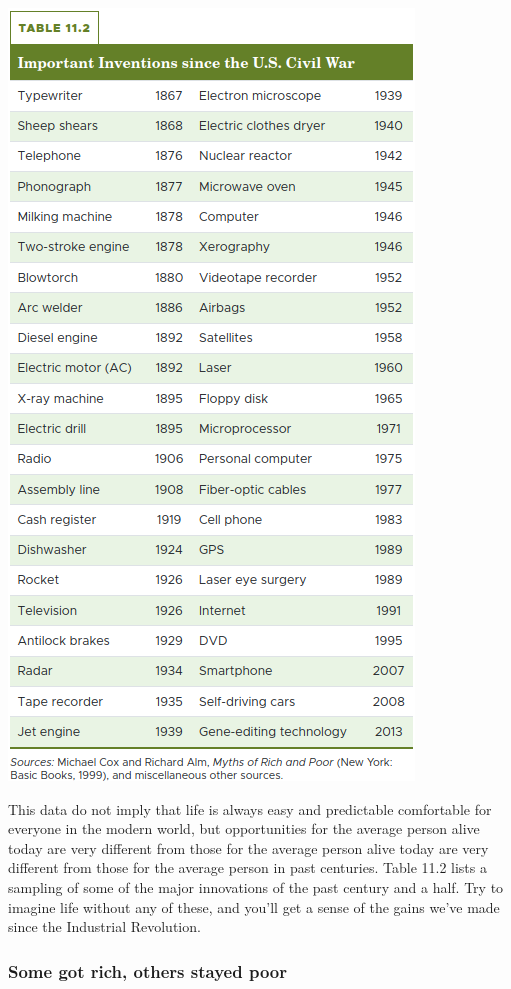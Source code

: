 \documentclass[11pt]{article} %
\begin{document}
\begin{center}
\includegraphics[scale=0.3]{../../images/Chapter 11/table 11.2.png}
\end{center}

This data do not imply that life is always easy and predictable comfortable for everyone in the modern world, but opportunities for the average person alive today are very different from those for the average person alive today are very different from those for the average person in past centuries. Table 11.2 lists a sampling of some of the major innovations of the past century and a half. Try to imagine life without any of these, and you'll get a sense of the gains we've made since the Industrial Revolution.

\subsubsection*{Some got rich, others stayed poor}
\end{document}
